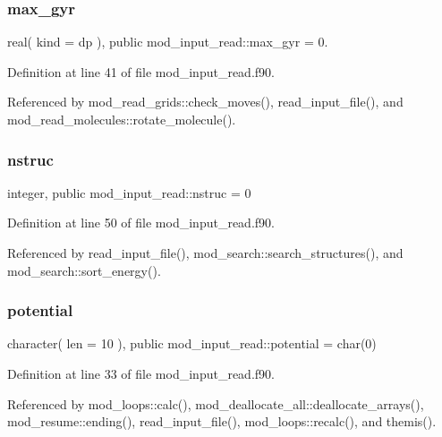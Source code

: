 \subsubsection{\texorpdfstring{max\+\_\+gyr}{max\_gyr}}
{\footnotesize\ttfamily real( kind = dp ), public mod\+\_\+input\+\_\+read\+::max\+\_\+gyr = 0.}



Definition at line 41 of file mod\+\_\+input\+\_\+read.\+f90.



Referenced by mod\+\_\+read\+\_\+grids\+::check\+\_\+moves(), read\+\_\+input\+\_\+file(), and mod\+\_\+read\+\_\+molecules\+::rotate\+\_\+molecule().

\mbox{\label{namespacemod__input__read_a8aa83854894f2e947a4e1015697433d0}} 
\subsubsection{\texorpdfstring{nstruc}{nstruc}}
{\footnotesize\ttfamily integer, public mod\+\_\+input\+\_\+read\+::nstruc = 0}



Definition at line 50 of file mod\+\_\+input\+\_\+read.\+f90.



Referenced by read\+\_\+input\+\_\+file(), mod\+\_\+search\+::search\+\_\+structures(), and mod\+\_\+search\+::sort\+\_\+energy().

\mbox{\label{namespacemod__input__read_aaf9a85c22da4f3ae7bbcc9ba72d783dd}} 
\subsubsection{\texorpdfstring{potential}{potential}}
{\footnotesize\ttfamily character( len = 10 ), public mod\+\_\+input\+\_\+read\+::potential = char(0)}



Definition at line 33 of file mod\+\_\+input\+\_\+read.\+f90.



Referenced by mod\+\_\+loops\+::calc(), mod\+\_\+deallocate\+\_\+all\+::deallocate\+\_\+arrays(), mod\+\_\+resume\+::ending(), read\+\_\+input\+\_\+file(), mod\+\_\+loops\+::recalc(), and themis().

